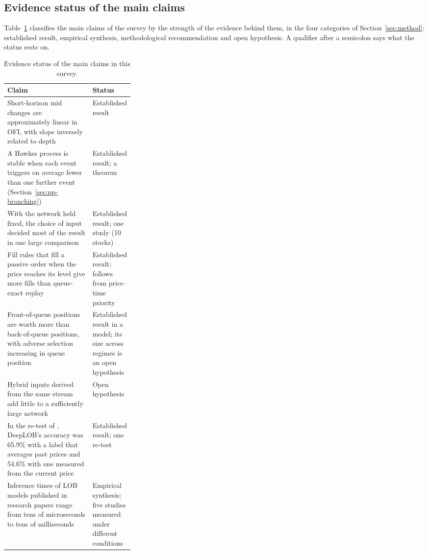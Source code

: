 \subsection{Evidence status of the main claims}
\label{sec:evidence-status}

Table~\ref{tab:evidence} classifies the main claims of the survey by the strength of the evidence behind them, in the
four categories of Section~\ref{sec:method}: established result, empirical synthesis, methodological recommendation and
open hypothesis. A qualifier after a semicolon says what the status rests on.

\begin{table}[!htbp]
\centering\small
\caption{Evidence status of the main claims in this survey.}
\label{tab:evidence}
\begin{tabularx}{\linewidth}{X>{\raggedright\arraybackslash}p{0.3\linewidth}}
\toprule
Claim & Status \\
\midrule
Short-horizon mid changes are approximately linear in OFI, with slope inversely related to
  depth~\citep{cks2014} & Established result \\
A Hawkes process is stable when each event triggers on average fewer than one further event
  (Section~\ref{sec:pp-branching}) & Established result; a theorem \\
With the network held fixed, the choice of input decided most of the result in one large
  comparison~\citep{lucchese2024} & Established result; one study (10 stocks) \\
Fill rules that fill a passive order when the price reaches its level give more fills than queue-exact replay & Established result;
  follows from price--time priority \\
Front-of-queue positions are worth more than back-of-queue positions, with adverse selection
  increasing in queue position~\citep{moallemi2017} & Established result in a model; its size across regimes is
  an open hypothesis \\
Hybrid inputs derived from the same stream add little to a sufficiently large network & Open hypothesis \\
In the re-test of \citet{lee2024predictability}, DeepLOB's accuracy was 65.9\% with a label that averages past
  prices and 54.6\% with one measured from the current price & Established result; one re-test \\
Inference times of LOB models published in research papers range from tens of microseconds to tens of milliseconds & Empirical synthesis; five studies measured under different conditions \\

\end{tabularx}
\end{table}
